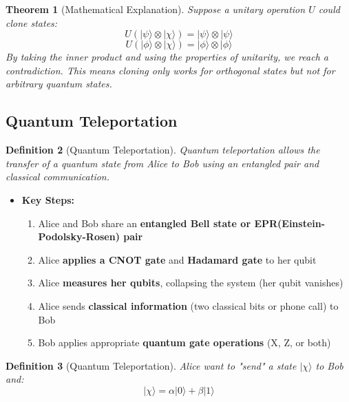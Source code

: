\documentclass{article}
\newtheorem{theorem}{Theorem}[subsection]
\newtheorem{definition}[theorem]{Definition}
\begin{document}
\begin{theorem}[Mathematical Explanation]
Suppose a unitary operation \(U\) could clone states:
\[
U(|\psi\rangle \otimes |\chi\rangle) = |\psi\rangle \otimes |\psi\rangle
\]
\[
U(|\phi\rangle \otimes |\chi\rangle) = |\phi\rangle \otimes |\phi\rangle
\]
By taking the inner product and using the properties of unitarity, we reach a contradiction. This means cloning only works for orthogonal states but not for arbitrary quantum states.
\end{theorem}

\subsection{Quantum Teleportation}
\begin{definition}[Quantum Teleportation]
Quantum teleportation allows the transfer of a quantum state from Alice to Bob using an entangled pair and classical communication.
\end{definition}

\begin{itemize}
    \item \textbf{Key Steps:}
    \begin{enumerate}
        \item Alice and Bob share an \textbf{entangled Bell state or EPR(Einstein-Podolsky-Rosen) pair}
        \item Alice \textbf{applies a CNOT gate} and \textbf{Hadamard gate} to her qubit
        \item Alice \textbf{measures her qubits}, collapsing the system (her qubit vanishes)
        \item Alice sends \textbf{classical information} (two classical bits or phone call) to Bob
        \item Bob applies appropriate \textbf{quantum gate operations} (X, Z, or both)
    \end{enumerate}
\end{itemize}

\begin{definition}[Quantum Teleportation]
Alice want to "send" a state \(|\chi\rangle\) to Bob and: \[ |\chi\rangle = \alpha|0\rangle + \beta|1\rangle \]
\end{definition}
\end{document}

